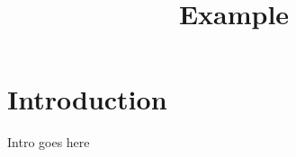\documentclass{article}
\title{Example}
\author{}
\date{}
\begin{document}
    \section{Introduction}\label{sec:introdution}
    Intro goes here
\end{document}
